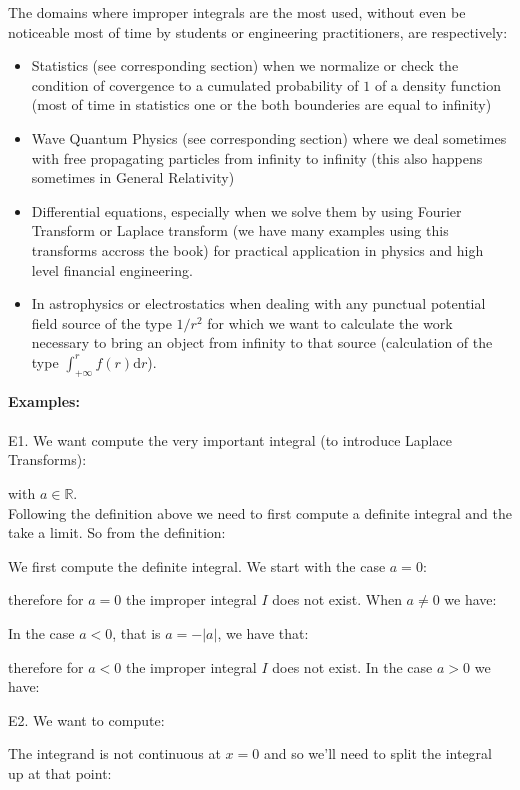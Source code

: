 	The domains where improper integrals are the most used, without even be noticeable most of time by students or engineering practitioners, are respectively:
	\begin{itemize}
		\item Statistics (see corresponding section) when we normalize or check the condition of covergence to a cumulated probability of $1$ of a density function (most of time in statistics one or the both bounderies are equal to infinity)

		\item Wave Quantum Physics (see corresponding section) where we deal sometimes with free propagating particles from infinity to infinity (this also happens sometimes in General Relativity)

		\item Differential equations, especially when we solve them by using Fourier Transform or Laplace transform (we have many examples using this transforms accross the book) for practical application in physics and high level financial engineering.

		\item In astrophysics or electrostatics when dealing with any punctual potential field source of the type $1/r^2$  for which we want to calculate the work necessary to bring an object from infinity to that source (calculation of the type $\int_{+\infty}^{r} f(r)\mathrm{d}r$).
	\end{itemize}
	\begin{tcolorbox}[colframe=black,colback=white,sharp corners]
	\textbf{{\Large {}}Examples:}\\\\
	E1. We want compute the very important integral (to introduce Laplace Transforms):
	
	with $a\in\mathbb{R}$.\\
	
	Following the definition above we need to first compute a definite integral and the take a limit. So from the definition:
	
	We first compute the definite integral. We start with the case $a=0$:
	
	therefore for $a=0$ the improper integral $I$ does not exist. When $a\neq 0$ we have:
	
	In the case $a<0$, that is $a=-|a|$, we have that:
	
	therefore for $a<0$ the improper integral $I$ does not exist. In the case $a>0$ we have:
	
	
	E2. We want to compute:
	
	The integrand is not continuous at $x=0$ and so we’ll need to split the integral up at that point:
	
	
	\end{tcolorbox}
	
